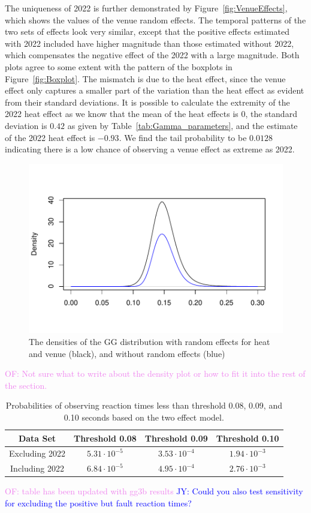 \documentclass[12pt, letterpaper]{article}
\newcommand{\jy}[1]{\textcolor{blue}{JY: #1}}
\newcommand{\of}[1]{\textcolor{violet}{OF: #1}}
\begin{document}
The uniqueness of 2022 is further demonstrated by Figure~\ref{fig:VenueEffects},
which shows the values of the venue random effects.  The temporal patterns
of the two sets of effects look very similar, except that the positive effects
estimated with 2022 included have higher magnitude than those estimated without
2022, which compensates the negative effect of the 2022 with a large magnitude.
Both plots agree to some extent with the pattern of the boxplots in
Figure~\ref{fig:Boxplot}. The mismatch is due to the heat effect, since the venue
effect only captures a smaller part of the variation than the heat effect as
evident from their standard deviations. It is possible to calculate the extremity
of the 2022 heat effect as we know that the mean of the heat effects is $0$,
the standard deviation is $0.42$ as given by Table~\ref{tab:Gamma_parameters},
and the estimate of the 2022 heat effect is $-0.93$. We find the tail probability
to be $0.0128$ indicating there is a low chance of observing a venue effect as
extreme as 2022.


\begin{figure}[tbp]
  \centering
  \includegraphics{GGDensity}
  \caption{The densities of the GG distribution with random effects for heat
  and venue (black), and without random effects (blue)}
  \label{fig:DensityPlot}
\end{figure}
\of{Not sure what to write about the density plot or how to fit it into the rest
of the section.}

\begin{table}
  \centering
  \caption{Probabilities of observing reaction times less than threshold 0.08,
  0.09, and 0.10 seconds based on the two effect model.}
  \begin{tabular}{c c c c} 
   \toprule
   Data Set & Threshold 0.08 & Threshold 0.09 & Threshold 0.10  \\ 
   \midrule
   Excluding 2022 & $5.31\cdot10^{-5}$ & $3.53\cdot10^{-4}$ &  $1.94\cdot10^{-3}$  \\ 
   Including 2022 & $6.84\cdot10^{-5}$ & $4.95\cdot10^{-4}$ & $2.76\cdot10^{-3}$ \\
   \bottomrule
  \end{tabular}
  \label{tab:Sim_probability}
\end{table}
\of{table has been updated with gg3b results}
\jy{Could you also test sensitivity for excluding the positive but
  fault reaction times?}
\end{document}
